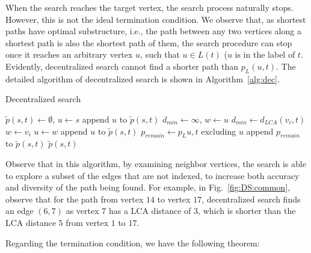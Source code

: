 When the search reaches the target vertex, the search process naturally stops. However, this is not the ideal termination condition. We observe that, as shortest paths have optimal substructure, i.e., the path between any two vertices along a shortest path is also the shortest path of them, the search procedure can stop once it reaches an arbitrary vertex $u$, such that $u \in L(t)$ ($u$ is in the label of $t$. %
Evidently, decentralized search cannot find a shorter path than $p_L(u,t)$. The detailed algorithm of decentralized search is shown in Algorithm~\ref{alg:dec}.

\begin{algorithm}
    \caption{Decentralized search}
		\label{alg:dec}
    \begin{algorithmic}
						\State $\tilde{p}(s,t) \gets \emptyset$, $u \gets s$
						\State append $u$ to $\tilde{p}(s,t)$
								\State $d_{min} \gets \infty$, $w \gets u$
												\State $d_{min} \gets d_{LCA}(v_i,t)$
												\State $w \gets v_i$
										\EndIf
								\EndFor
								\State $u \gets w$
								\State append $u$ to $\tilde{p}(s,t)$
						\EndWhile
						\State $p_{remain} \gets p_L{u,t}$ excluding $u$
						\State append $p_{remain}$ to $\tilde{p}(s,t)$
						\State \Return $\tilde{p}(s,t)$
        \EndFunction
    \end{algorithmic}
\end{algorithm}

Observe that in this algorithm, by examining neighbor vertices, the search is able to explore a subset of the edges that are not indexed, to increase both accuracy and diversity of the path being found. For example, in Fig.~\ref{fig:DS:common}, observe that for the path from vertex $14$ to vertex $17$, decentralized search finds an edge $(6, 7)$ as vertex $7$ has a LCA distance of $3$, which is shorter than the LCA distance $5$ from vertex $1$ to $17$.

Regarding the termination condition, we have the following theorem:

